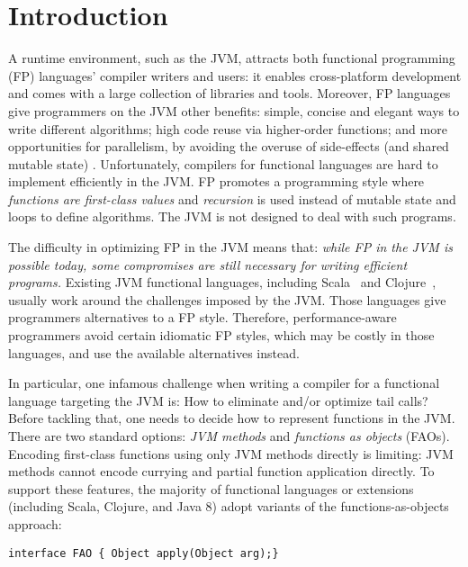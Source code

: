 \section{Introduction}\label{sec:intro}

A runtime environment, such as the JVM, attracts both functional programming (FP) languages'
compiler writers and users: it enables cross-platform development and comes with a
large collection of libraries and tools. Moreover, FP languages give programmers
on the JVM other benefits: simple, concise and elegant ways to write different algorithms;
high code reuse via higher-order functions; and more opportunities for parallelism,
 by avoiding the overuse of side-effects (and shared mutable state) \cite{erlang}.
 Unfortunately, compilers for functional languages are hard to
implement efficiently in the JVM. FP promotes a
programming style where \emph{functions are first-class values} and \emph{recursion} is used
instead of mutable state and loops to define algorithms. The JVM is
not designed to deal with such programs.


The difficulty in optimizing FP in the JVM means that:
\emph{while FP in the JVM is possible today,
some compromises are still necessary for writing efficient programs.}
Existing JVM functional languages, including
Scala~\cite{Odersky2014b}
and Clojure~\cite{Hickey2008}, usually
work around the challenges imposed by the JVM. Those languages give
programmers alternatives to a FP
style. Therefore, performance-aware programmers avoid certain idiomatic
FP styles, which may be costly in those languages, and use
the available alternatives instead.

In particular, one infamous challenge when writing a
compiler for a functional language targeting the JVM is: How to eliminate and/or optimize tail calls?
Before tackling that, one needs to decide how to represent functions in the JVM.
There are two standard options: \emph{JVM methods} and
\emph{functions as objects} (FAOs).
Encoding first-class functions using only JVM methods directly is
limiting: JVM methods cannot encode currying and partial function application directly.
To support these features, the majority of functional languages or extensions (including Scala,
Clojure, and Java 8) adopt variants of the functions-as-objects
approach:

\begin{lstlisting}
interface FAO { Object apply(Object arg);}
\end{lstlisting}

